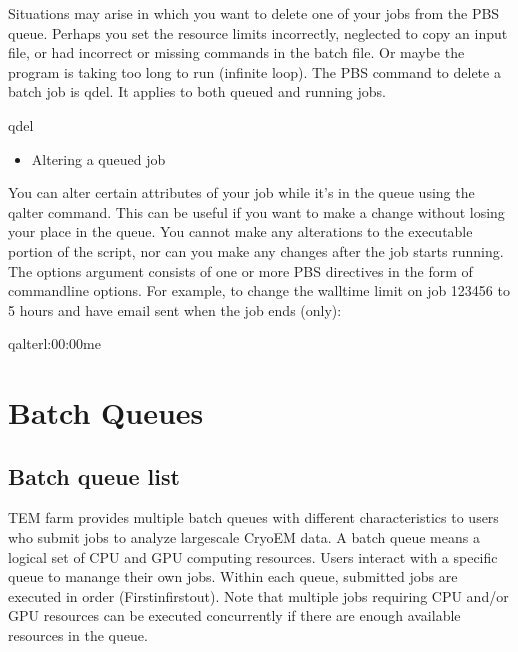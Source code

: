\documentclass[a4paper,10pt,english]{sphinxmanual}
\begin{document}
\sphinxAtStartPar
Situations may arise in which you want to delete one of your jobs from the PBS queue. Perhaps you set the resource limits incorrectly, neglected to copy an input file, or had incorrect or missing commands in the batch file. Or maybe the program is taking too long to run (infinite loop). The PBS command to delete a batch job is qdel. It applies to both queued and running jobs.

\begin{sphinxVerbatim}[commandchars=\\\{\}]
\PYGZdl{}\PYGZgt{}qdel
\end{sphinxVerbatim}
\begin{itemize}
\item {} 
\sphinxAtStartPar
Altering a queued job

\end{itemize}

\sphinxAtStartPar
You can alter certain attributes of your job while it’s in the queue using the qalter command. This can be useful if you want to make a change without losing your place in the queue. You cannot make any alterations to the executable portion of the script, nor can you make any changes after the job starts running.
The options argument consists of one or more PBS directives in the form of command\sphinxhyphen{}line options. For example, to change the walltime limit on job 123456 to 5 hours and have email sent when the job ends (only):

\begin{sphinxVerbatim}[commandchars=\\\{\}]
\PYGZdl{}\PYGZgt{}qalter\PYGZhy{}l:00:00\PYGZhy{}me
\end{sphinxVerbatim}

\sphinxstepscope


\chapter{Batch Queues}
\label{\detokenize{queue:batch-queues}}\label{\detokenize{queue::doc}}

\section{Batch queue list}
\label{\detokenize{queue:batch-queue-list}}
\sphinxAtStartPar
TEM farm provides multiple batch queues with different characteristics to users who submit jobs to analyze large\sphinxhyphen{}scale Cryo\sphinxhyphen{}EM data.
A batch queue means a logical set of CPU and GPU computing resources.
Users interact with a specific queue to manange their own jobs.
Within each queue, submitted jobs are executed in order (First\sphinxhyphen{}in\sphinxhyphen{}first\sphinxhyphen{}out).
Note that multiple jobs requiring CPU and/or GPU resources can be executed concurrently if there are enough available resources in the queue.
\end{document}
